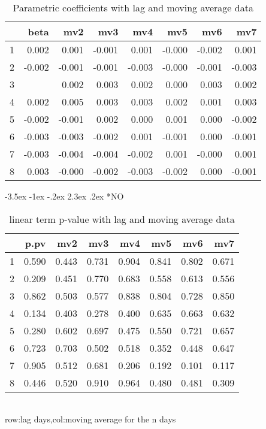 \documentclass[a4paper, 12pt]{article}
\makeatletter
\def\large{\fontsize{14}{20}\selectfont}
\renewcommand\subsection{\@startsection {subsection}{1}{\z@}%
                                   {-3.5ex \@plus -1ex \@minus -.2ex}%
                                   {2.3ex \@plus.2ex}%
                                   {\centering\normalfont\large\bfseries}}
\makeatother
\begin{document}
\begin{table}[h]
\centering
\caption{Parametric coefficients with lag and moving average data}
\begin{tabular}{rrrrrrrr}
  \hline
 & beta & mv2 & mv3 & mv4 & mv5 & mv6 & mv7 \\
  \hline
1 & 0.002 & 0.001 & -0.001 & 0.001 & -0.000 & -0.002 & 0.001 \\
  2 & -0.002 & -0.001 & -0.001 & -0.003 & -0.000 & -0.001 & -0.003 \\
  3 & \color{red}{0.004} & 0.002 & 0.003 & 0.002 & 0.000 & 0.003 & 0.002 \\
  4 & 0.002 & 0.005 & 0.003 & 0.003 & 0.002 & 0.001 & 0.003 \\
  5 & -0.002 & -0.001 & 0.002 & 0.000 & 0.001 & 0.000 & -0.002 \\
  6 & -0.003 & -0.003 & -0.002 & 0.001 & -0.001 & 0.000 & -0.001 \\
  7 & -0.003 & -0.004 & -0.004 & -0.002 & 0.001 & -0.000 & 0.001 \\
  8 & 0.003 & -0.000 & -0.002 & -0.003 & -0.002 & 0.000 & -0.001 \\
   \hline
\end{tabular}
\end{table}
\clearpage
\subsection*{NO}
\begin{table}[h]
\centering
\caption{linear term p-value with lag and moving average data}
\begin{tabular}{rrrrrrrr}
  \hline
 & p.pv & mv2 & mv3 & mv4 & mv5 & mv6 & mv7 \\
  \hline
1 & 0.590 & 0.443 & 0.731 & 0.904 & 0.841 & 0.802 & 0.671 \\
  2 & 0.209 & 0.451 & 0.770 & 0.683 & 0.558 & 0.613 & 0.556 \\
  3 & 0.862 & 0.503 & 0.577 & 0.838 & 0.804 & 0.728 & 0.850 \\
  4 & 0.134 & 0.403 & 0.278 & 0.400 & 0.635 & 0.663 & 0.632 \\
  5 & 0.280 & 0.602 & 0.697 & 0.475 & 0.550 & 0.721 & 0.657 \\
  6 & 0.723 & 0.703 & 0.502 & 0.518 & 0.352 & 0.448 & 0.647 \\
  7 & 0.905 & 0.512 & 0.681 & 0.206 & 0.192 & 0.101 & 0.117 \\
  8 & 0.446 & 0.520 & 0.910 & 0.964 & 0.480 & 0.481 & 0.309 \\
   \hline
\end{tabular}
\\row:lag days,col:moving average for the n days
\end{table}
\end{document}
